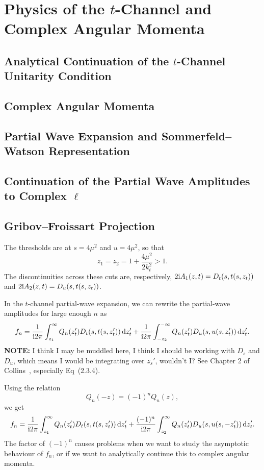 \chapter{Physics of the \texorpdfstring{$t$}{t}-Channel and Complex Angular Momenta}

\section{Analytical Continuation of the \texorpdfstring{$t$}{t}-Channel Unitarity Condition}
\section{Complex Angular Momenta}
\section{Partial Wave Expansion and Sommerfeld--Watson Representation}
\section{Continuation of the Partial Wave Amplitudes to Complex \texorpdfstring{$\ell$}{l}}
\section{Gribov--Froissart Projection}

\M
The thresholds are at $s=4\mu^{2}$ and $u=4\mu^{2}$, so that
\begin{equation}
z_{1} = z_{2} = 1 + \frac{4\mu^{2}}{2k_{t}^{2}} > 1.
\end{equation}
The discontinuities across these cuts are, respectively, $2\mathrm{i}A_{1}(z,t)=D_{t}(s,t(s,z_{t}))$
and $2\mathrm{i}A_{2}(z,t) = D_{u}(s,t(s,z_{t}))$.

\M
In the $t$-channel partial-wave expansion,
we can rewrite the partial-wave amplitudes for large enough $n$ as
\begin{equation}
f_{n} = \frac{1}{\mathrm{i}2\pi}\int^{\infty}_{z_{1}}Q_{n}(z_{t}')D_{t}(s,t(s,z_{t}'))\,\mathrm{d} z_{t}'
+ \frac{1}{\mathrm{i}2\pi}\int^{-\infty}_{-z_{2}}Q_{n}(z_{t}')D_{u}(s,u(s,z_{t}'))\,\mathrm{d} z_{t}'.
\end{equation}
\textbf{NOTE:} I think I may be muddled here, I think I should be
working with $D_{s}$ and $D_{u}$, which means I would be integrating
over $z_{s}'$, wouldn't I? See Chapter 2 of
Collins~\cite{Collins:1977jy}, especially Eq~(2.3.4).

\M
Using the relation
\begin{equation}
Q_{n}(-z)=(-1)^{n}Q_{n}(z),
\end{equation}
we get
\begin{equation}
f_{n} = \frac{1}{\mathrm{i}2\pi}\int^{\infty}_{z_{1}}Q_{n}(z_{t}')D_{t}(s,t(s,z_{t}'))\,\mathrm{d} z_{t}'
+ \frac{(-1)^{n}}{\mathrm{i}2\pi}\int^{\infty}_{z_{2}}Q_{n}(z_{t}')D_{u}(s,u(s,-z_{t}'))\,\mathrm{d} z_{t}'.
\end{equation}
The factor of $(-1)^{n}$ causes problems when we want to study the
asymptotic behaviour of $f_{n}$, or if we want to analytically continue
this to complex angular momenta.

